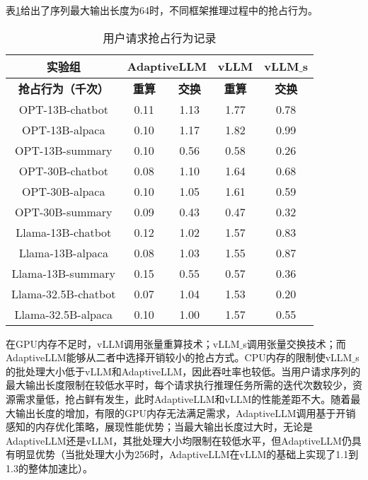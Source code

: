 表\ref{Table:用户请求抢占行为记录}给出了序列最大输出长度为64时，不同框架推理过程中的抢占行为。 \par

\begin{table}[H]
  \centering
  \caption{用户请求抢占行为记录}
  \label{Table:用户请求抢占行为记录}
  \renewcommand{\arraystretch}{1.25}
  \small
  \begin{tabular}{c c c c c}
    \toprule
    \textbf{实验组} & \multicolumn{2}{c}{\textbf{AdaptiveLLM}} & \textbf{vLLM} & \textbf{vLLM$\_$s} \\
    \midrule
    \textbf{抢占行为（千次）} & \textbf{重算} & \textbf{交换} & \textbf{重算} & \textbf{交换} \\
    \midrule
    OPT-13B-chatbot & 0.11 & 1.13 & 1.77 & 0.78 \\
    OPT-13B-alpaca & 0.10 & 1.17 & 1.82 & 0.99 \\
    OPT-13B-summary & 0.10 & 0.56 & 0.58 & 0.26 \\
    OPT-30B-chatbot & 0.08 & 1.10 & 1.64 & 0.68 \\
    OPT-30B-alpaca & 0.10 & 1.05 & 1.61 & 0.59 \\
    OPT-30B-summary & 0.09 & 0.43 & 0.47 & 0.32 \\
    Llama-13B-chatbot & 0.12 & 1.02 & 1.57 & 0.83 \\
    Llama-13B-alpaca & 0.08 & 1.03 & 1.55 & 0.87 \\
    Llama-13B-summary & 0.15 & 0.55 & 0.57 & 0.36 \\
    Llama-32.5B-chatbot & 0.07 & 1.04 & 1.53 & 0.20 \\
    Llama-32.5B-alpaca & 0.10 & 1.00 & 1.57 & 0.55 \\
    \bottomrule
  \end{tabular}
\end{table}

在GPU内存不足时，vLLM调用张量重算技术；vLLM$\_$s调用张量交换技术；而AdaptiveLLM能够从二者中选择开销较小的抢占方式。CPU内存的限制使vLLM$\_$s的批处理大小低于vLLM和AdaptiveLLM，因此吞吐率也较低。当用户请求序列的最大输出长度限制在较低水平时，每个请求执行推理任务所需的迭代次数较少，资源需求量低，抢占鲜有发生，此时AdaptiveLLM和vLLM的性能差距不大。随着最大输出长度的增加，有限的GPU内存无法满足需求，AdaptiveLLM调用基于开销感知的内存优化策略，展现性能优势；当最大输出长度过大时，无论是AdaptiveLLM还是vLLM，其批处理大小均限制在较低水平，但AdaptiveLLM仍具有明显优势（当批处理大小为256时，AdaptiveLLM在vLLM的基础上实现了1.1到1.3的整体加速比）。\par

